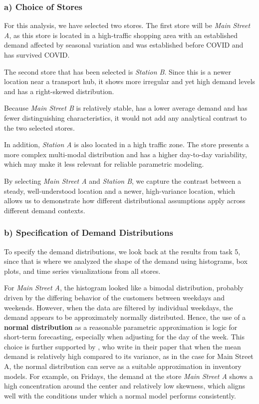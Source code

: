 \subsubsection*{a) Choice of Stores}
\medskip
For this analysis, we have selected two stores. The first store will be \emph{Main Street A}, as this store is located in a high-traffic shopping area with an established demand affected by seasonal variation and was established before COVID and has survived COVID. 

The second store that has been selected is \emph{Station B}. Since this is a newer location near a transport hub, it shows more irregular and yet high demand levels and has a right-skewed distribution.

Because \emph{Main Street B} is relatively stable, has a lower average demand and has fewer distinguishing characteristics, it would not add any analytical contrast to the two selected stores.

In addition, \emph{Station A} is also located in a high traffic zone. The store presents a more complex multi-modal distribution and has a higher day-to-day variability, which may make it less relevant for reliable parametric modeling. 

By selecting \emph{Main Street A} and \emph{Station B}, we capture the contrast between a steady, well-understood location and a newer, high-variance location, which allows us to demonstrate how different distributional assumptions apply across different demand contexts.

\subsubsection*{b) Specification of Demand Distributions}
\medskip

To specify the demand distributions, we look back at the results from task 5, since that is where we analyzed the shape of the demand using histograms, box plots, and time series visualizations from all stores. 

For \emph{Main Street A}, the histogram looked like a bimodal distribution, probably driven by the differing behavior of the customers between weekdays and weekends. However, when the data are filtered by individual weekdays, the demand appears to be approximately normally distributed. Hence, the use of a \textbf{normal distribution} as a reasonable parametric approximation is logic for short-term forecasting, especially when adjusting for the day of the week. 
This choice is further supported by \cite{ramaekers2008}, who write in their paper that when the mean demand is relatively high compared to its variance, as in the case for Main Street A, the normal distribution can serve as a suitable approximation in inventory models. For example, on Fridays, the demand at the store \emph{Main Street A} shows a high concentration around the center and relatively low skewness, which aligns well with the conditions under which a normal model performs consistently.

